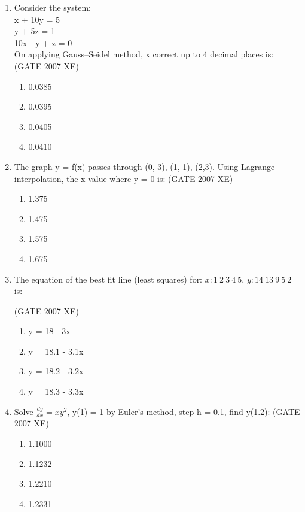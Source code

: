 \documentclass[journal,cmex10]{IEEEtran}
\theoremstyle{remark}
\numberwithin{equation}{enumi}
\numberwithin{figure}{enumi}
\begin{document}
\begin{enumerate}[label=\arabic*)]
    \item Consider the system:\\ x + 10y = 5 \\ y + 5z = 1 \\ 10x - y + z = 0\\ On applying Gauss–Seidel method, x correct up to 4 decimal places is:\\
    \hfill{(GATE 2007 XE)}
    \begin{multicols}{4}
    \begin{enumerate}
        \item 0.0385
        \item 0.0395
        \item 0.0405
        \item 0.0410
    \end{enumerate}
\end{multicols}

    \item The graph y = f(x) passes through (0,-3), (1,-1), (2,3). Using Lagrange interpolation, the x-value where y = 0 is:
    \hfill{(GATE 2007 XE)}
    \begin{multicols}{4}
    \begin{enumerate}
        \item 1.375
        \item 1.475
        \item 1.575
        \item 1.675
    \end{enumerate}
\end{multicols}

    \item The equation of the best fit line (least squares) for: $x: 1\ 2\ 3\ 4\ 5$, $y: 14\ 13\ 9\ 5\ 2 $ is:

    \hfill{(GATE 2007 XE)}
    \begin{multicols}{4}
    \begin{enumerate}
        \item y = 18 - 3x
        \item y = 18.1 - 3.1x
        \item y = 18.2 - 3.2x
        \item y = 18.3 - 3.3x
    \end{enumerate}
\end{multicols}

    \item Solve $\frac{dy}{dx} = xy^2$, y(1) = 1 by Euler's method, step h = 0.1, find y(1.2):
    \hfill{(GATE 2007 XE)}
    \begin{multicols}{4}
    \begin{enumerate}
        \item 1.1000
        \item 1.1232
        \item 1.2210
        \item 1.2331
    \end{enumerate}
\end{multicols}


\end{enumerate}
\end{document}

